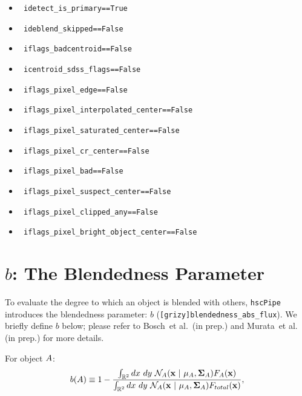 \documentclass[useamsfonts]{pasj01}
\def\etal{{\ et al.~}}
\def\hscpipe{\texttt{hscPipe}}
\begin{document}
    \begin{itemize}

        \item[ ] \texttt{ idetect\_is\_primary==True }
        \item[ ] \texttt{ ideblend\_skipped==False }
        \item[ ] \texttt{ iflags\_badcentroid==False }
        \item[ ] \texttt{ icentroid\_sdss\_flags==False }
        \item[ ] \texttt{ iflags\_pixel\_edge==False }
        \item[ ] \texttt{ iflags\_pixel\_interpolated\_center==False }
        \item[ ] \texttt{ iflags\_pixel\_saturated\_center==False }
        \item[ ] \texttt{ iflags\_pixel\_cr\_center==False }
        \item[ ] \texttt{ iflags\_pixel\_bad==False }
        \item[ ] \texttt{ iflags\_pixel\_suspect\_center==False }
        \item[ ] \texttt{ iflags\_pixel\_clipped\_any==False }
        \item[ ] \texttt{ iflags\_pixel\_bright\_object\_center==False }

    \end{itemize}


\section{$b$: The Blendedness Parameter}
    \label{app:defineb}

    To evaluate the degree to which an object is blended with others, \hscpipe{} 
    introduces the blendedness parameter: $b$ (\texttt{[grizy]blendedness\_abs\_flux}).
    We briefly define  $b$ below; please refer to Bosch\etal (in prep.) and Murata\etal 
    (in prep.) for more details.

    For object ${\rm A}$:
    \begin{eqnarray*}
        b({\rm A}) \equiv
        1-\frac{\int_{\mathbb{R}^2} {\rm d}x~ {\rm d}y\ \mathcal{N}_{\mathrm{A}}({\bf x}\ |\  \mu_{\mathrm{A}}, {\bf\Sigma}_{\mathrm{A}})
        F_{\mathrm{A}}({\bf x})}{\int_{\mathbb{R}^2} {\rm d}x~ {\rm d}y\ \mathcal{N}_{\mathrm{A}}({\bf x}\ |\  \mu_{\mathrm{A}},
        {\bf\Sigma}_{\rm{A}}) F_{\rm{total}}({\bf x})},
        \label{eq:defineb}
    \end{eqnarray*}
\end{document}
